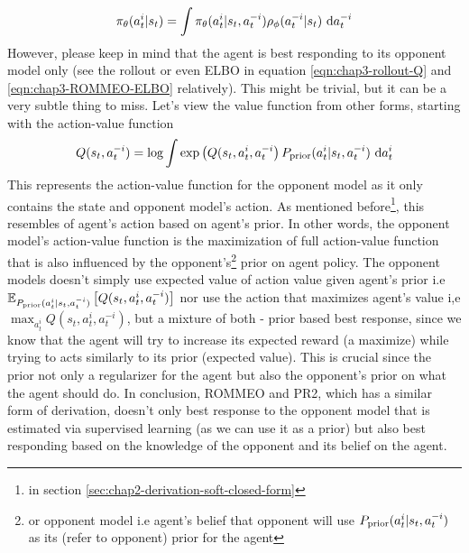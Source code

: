 \begin{equation}
\label{eqn:chap3-ROMMEO-execute-action}
\pi_\theta(a^i_t |s_t) = \int \pi_\theta(a^i_t | s_t, a^{-i}_t) \rho_\phi(a^{-i}_t | s_t) \ \mathrm{d} a^{-i}_t 
\end{equation}
However, please keep in mind that the agent is best responding to its opponent model only (see the rollout or even ELBO in equation \ref{eqn:chap3-rollout-Q} and \ref{eqn:chap3-ROMMEO-ELBO} relatively). This might be trivial, but it can be a very subtle thing to miss. 
Let's view the value function from other forms, starting with the action-value function 
\begin{equation}
    Q(s_t, a^{-i}_t) = \log \int \exp \left( Q(s_t, a^i_t, a^{-i}_t \right)P_{\text{prior}}(a^i_t | s_t, a^{-i}_t)  \ \mathrm{d} a^i_t 
\end{equation}
This represents the action-value function for the opponent model as it only contains the state and opponent model's action. As mentioned before\footnote{in section \ref{sec:chap2-derivation-soft-closed-form}}, this resembles  of agent's action based on agent's prior. In other words, the opponent model's action-value function is the maximization of full action-value function that is also influenced by the opponent's\footnote{or opponent model i.e agent's belief that opponent will use $P_{\text{prior}} (a^i_t | s_t, a^{-i}_t)$ as its (refer to opponent) prior for the agent} prior on agent policy. The opponent models doesn't simply use expected value of action value given agent's prior i.e $\mathbb{E}_{P_{\text{prior}} (a^i_t | s_t, a^{-i}_t)}\left[ Q(s_t, a^i_t, a^{-i}_t) \right]$ nor use the action that maximizes agent's value i,e $\max_{a^i_t} Q(s_t, a^i_t, a^{-i}_t)$, but a mixture of both - prior based best response, since we know that the agent will try to increase its expected reward (a maximize) while trying to acts similarly to its prior (expected value). This is crucial since the prior not only a regularizer for the agent but also the opponent's prior on what the agent should do. In conclusion, ROMMEO and PR2, which has a similar form of derivation, doesn't only best response to the opponent model that is estimated via supervised learning (as we can use it as a prior) but also best responding based on the knowledge of the opponent and its belief on the agent.

